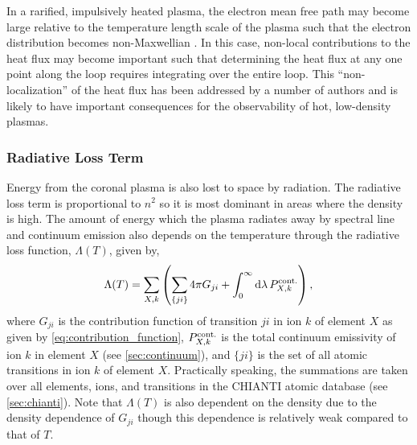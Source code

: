 In a rarified, impulsively heated plasma, the electron mean free path may become large relative to the temperature length scale of the plasma such that the electron distribution becomes non-Maxwellian \citep{bradshaw_collisional_2013}. In this case, non-local contributions to the heat flux may become important such that determining the heat flux at any one point along the loop requires integrating over the entire loop. This ``non-localization'' of the heat flux has been addressed by a number of authors \citep{ljepojevic_heat_1989,karpen_nonlocal_1987,luciani_nonlocal_1983,west_lifetime_2008} and is likely to have important consequences for the observability of hot, low-density plasmas.

\subsubsection{Radiative Loss Term}\label{sec:rad-loss}

Energy from the coronal plasma is also lost to space by radiation. The radiative loss term is proportional to $n^2$ so it is most dominant in areas where the density is high. The amount of energy which the plasma radiates away by spectral line and continuum emission also depends on the temperature through the radiative loss function, $\Lambda(T)$, given by,
\begin{equation}\label{eq:rad-loss}
    \Lambda(T) = \sum_{X,k}\left(\sum_{\{ji\}}4\pi G_{ji}  + \int_0^\infty\textup{d}\lambda\,P_{X,k}^\textup{cont.} \right),
\end{equation}
where $G_{ji}$ is the contribution function of transition $ji$ in ion $k$ of element $X$ as given by \autoref{eq:contribution_function}, $P_{X,k}^\textup{cont.}$ is the total continuum emissivity of ion $k$ in element $X$ (see \autoref{sec:continuum}), and $\{ji\}$ is the set of all atomic transitions in ion $k$ of element $X$. Practically speaking, the summations are taken over all elements, ions, and transitions in the CHIANTI atomic database (see \autoref{sec:chianti}). Note that $\Lambda(T)$ is also dependent on the density due to the density dependence of $G_{ji}$ though this dependence is relatively weak compared to that of $T$.

